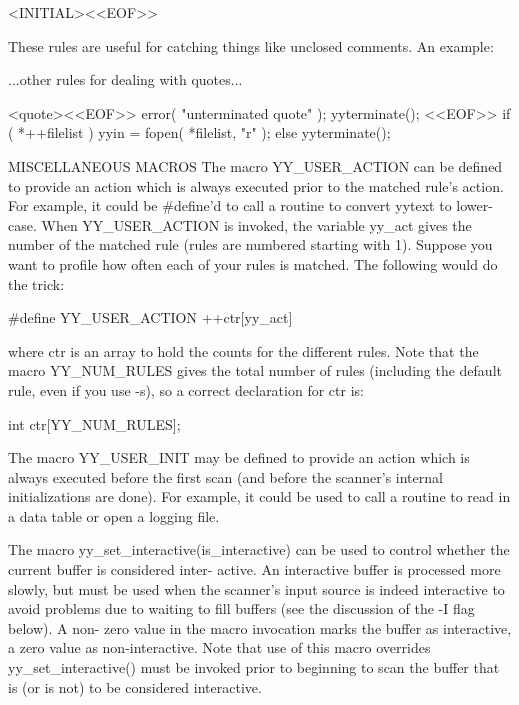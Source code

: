 \documentclass[12pt,spanish,twocolumn,lettersize]{article}
\begin{document}
{	   <INITIAL><<EOF>>

       These rules are useful for catching things  like	 unclosed
       comments.  An example:


	   ...other rules for dealing with quotes...

	   <quote><<EOF>>   {
		    error( "unterminated quote" );
		    yyterminate();
		    }
	   <<EOF>>  {
		    if ( *++filelist )
			yyin = fopen( *filelist, "r" );
		    else
		       yyterminate();
		    }

MISCELLANEOUS MACROS
       The  macro  YY_USER_ACTION  can	be  defined to provide an
       action which is	always	executed  prior	 to  the  matched
       rule's action.  For example, it could be #define'd to call
       a  routine  to  convert	yytext	 to   lower-case.    When
       YY_USER_ACTION  is  invoked, the variable yy_act gives the
       number of the matched rule (rules  are  numbered	 starting
       with  1).   Suppose  you want to profile how often each of
       your rules is matched.  The following would do the trick:

	   #define YY_USER_ACTION ++ctr[yy_act]

       where ctr is an array to hold the counts for the different
       rules.	Note  that the macro YY_NUM_RULES gives the total
       number of rules (including the default rule, even  if  you
       use -s), so a correct declaration for ctr is:

	   int ctr[YY_NUM_RULES];

       The macro YY_USER_INIT may be defined to provide an action
       which is always executed before the first scan (and before
       the  scanner's  internal	 initializations  are done).  For
       example, it could be used to call a routine to read  in	a
       data table or open a logging file.

       The  macro  yy_set_interactive(is_interactive) can be used
       to control whether the current buffer is considered inter-
       active.	 An  interactive buffer is processed more slowly,
       but must be used when the scanner's input source is indeed
       interactive  to	avoid  problems	 due  to  waiting to fill
       buffers (see the discussion of the -I flag below).  A non-
       zero  value  in	the  macro invocation marks the buffer as
       interactive, a zero value as non-interactive.   Note  that
       use  of this macro overrides %
       yy_set_interactive() must be invoked prior to beginning to
       scan the buffer that is	(or  is	 not)  to  be  considered
       interactive.

}
\end{document}
